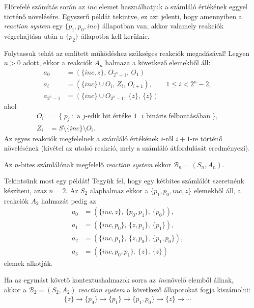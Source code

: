 \documentclass[12pt]{article}
\theoremstyle{definition}
\theoremstyle{remark}
\theoremstyle{plain}
\theoremstyle{plain}
\newcommand{\inc}{\textit{inc}}
\newcommand{\reaction}[3]{
    (#1, \, #2, \, #3)
}
\begin{document}
    Előrefelé számítás során az $\textit{inc}$ elemet használhatjuk a számláló értékének eggyel történő növelésére. Egyszerű példát tekintve, ez azt jelenti, hogy amennyiben a \textit{reaction system} egy $\{p_{1}, p_{0}, \textit{inc}\}$ állapotban van, akkor valamely reakciók végrehajtása után a $\{ p_{2} \}$ állapotba kell kerülnie.

    Folytassuk tehát az említett működéshez szükséges reakciók megadásával! Legyen $n > 0$ adott, ekkor a reakciók $A_{n}$ halmaza a következő elemekből áll:
    \begin{align*}
        a_{0} &= \reaction{\{ \inc, z \}}{O_{2^{n}-1}}{O_{1}} \\
        a_{i} &= \reaction{\{ \inc \} \cup O_{i}}{Z_{i}}{O_{i + 1}}, \qquad 1 \leq i < 2^{n} - 2, \\
        a_{2^{n}-1} &= \reaction{\{ \inc \} \cup O_{2^{n} - 1}}{\{z\}}{\{z\}}
    \end{align*}
    ahol
    \begin{align*}
        O_{i} &= \{ \; p_{j} \; : \; \text{a $j$-edik bit értéke $1$ $i$ bináris felbontásában} \; \}, \\
        Z_{i} &= S \setminus\{ \inc \} \setminus O_{i}.
    \end{align*}
    Az egyes reakciók megfelelnek a számláló értékének $i$-ről $i + 1$-re történő növelésének (kivétel az utolsó reakció, mely a számláló átfordulását eredményezi).

    Az $n$-bites számlálónak megfelelő \textit{reaction system} ekkor $\mathcal{B}_{n}=(S_{n}, A_{n})$.

    Tekintsünk most egy példát! Tegyük fel, hogy egy kétbites számlálót szeretnénk készíteni, azaz $n = 2$. Az $S_{2}$ alaphalmaz ekkor a $\{p_{1}, p_{0}, \inc, z \}$ elemekből áll, a reakciók $A_{2}$ halmazát pedig az
    \begin{align*}
        a_{0} &= \reaction{\{ \inc, z \}}{\{p_{0}, p_{1}\}}{\{ p_{0} \}}, \\
        a_{1} &= \reaction{\{ \inc, p_{0} \}}{\{ z, p_{1} \}}{\{ p_{1} \}}, \\
        a_{2} &= \reaction{\{ \inc, p_{1} \}}{\{ z, p_{0} \}}{\{ p_{1}, p_{0} \}}, \\
        a_{3} &= \reaction{\{ \inc, p_{0}, p_{1} \}}{\{z\}}{\{z\}}
    \end{align*}
    elemek alkotják.

    Ha az egymást követő kontextushalmazok sorra az \inc növelő elemből állnak, akkor a $\mathcal{B}_{2} = (S_{2}, A_{2})$ \textit{reaction system} a következő állapotokat fogja kiszámolni:
    \begin{align*}
        \{z\} \rightarrow \{p_{0}\} \rightarrow \{p_{1}\} \rightarrow \{p_{1}, p_{0}\} \rightarrow \{z\} \rightarrow \cdots
    \end{align*}
\end{document}
